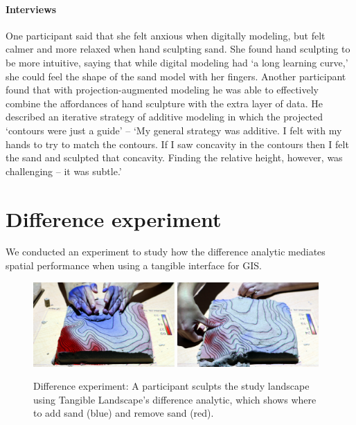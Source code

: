 \documentclass[prodmode,acmtochi]{acmsmall} %
\begin{document}
\paragraph{Interviews}
One participant said that she felt anxious when digitally modeling,
but felt calmer and more relaxed when hand sculpting sand. 
%
She found hand sculpting to be more intuitive, saying that
while digital modeling had `a long learning curve,' 
she could feel the shape of the sand model with her fingers.
%
Another participant found that 
with projection-augmented modeling 
he was able to effectively combine 
the affordances of hand sculpture 
with the extra layer of data. 
%
He described an iterative strategy of additive modeling
in which the projected `contours were just a guide' --  
`My general strategy was additive. 
I felt with my hands to try to match the contours. 
If I saw concavity in the contours 
then I felt the sand and sculpted that concavity.
Finding the relative height, however, was challenging -- it was subtle.'

\section{Difference experiment}
We conducted an experiment to study 
how the difference analytic mediates spatial performance 
when using a tangible interface for GIS.

\begin{figure}
\begin{center}
	\includegraphics[width=0.48\textwidth]{images/experiments/difference_1.jpg}
	\includegraphics[width=0.48\textwidth]{images/experiments/difference_2.jpg}
	\caption{Difference experiment: 
	A participant sculpts the study landscape using Tangible Landscape's difference
	analytic, which shows where to add sand (blue) and remove sand (red).}
	\label{fig:diff}
\end{center}
\end{figure}
\end{document}
